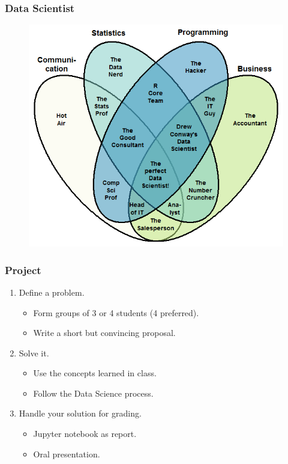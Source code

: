 \documentclass{beamer}
\begin{document}
\begin{frame}
	\frametitle{Data Scientist}
	\begin{figure}
		\includegraphics[height=0.8\textheight]{data_scientist}
	\end{figure}
\end{frame}


\begin{frame}
	\frametitle{Project}
	\begin{enumerate}
		\item Define a problem.
			\begin{itemize}
				\item Form groups of 3 or 4 students (4 preferred).
				\item Write a short but convincing proposal.
			\end{itemize}
		\vfill
		\item Solve it.
			\begin{itemize}
				\item Use the concepts learned in class.
				\item Follow the Data Science process.
			\end{itemize}
		\vfill
		\item Handle your solution for grading.
			\begin{itemize}
				\item Jupyter notebook as report.
				\item Oral presentation.
			\end{itemize}
	\end{enumerate}
\end{frame}
\end{document}
